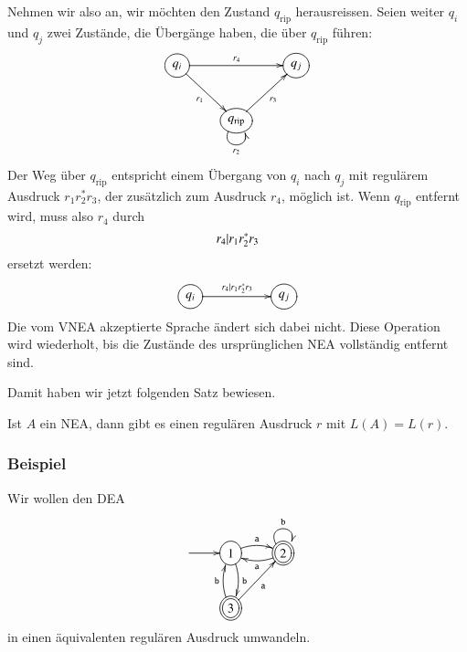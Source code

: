 Nehmen wir also an, wir möchten den Zustand $q_ {\text{rip}}$
herausreissen.
Seien weiter $q_i$ und $q_j$ zwei Zustände, die
Übergänge haben, die über $q_{\text{rip}}$ führen:
\[
\entrymodifiers={++[o][F]}
\xymatrix{
{q_i}\ar[rr]^{r_4} \ar[dr]_{r_1}
	&*+\txt{}
		&{q_j}
\\
*+\txt{}
	&{q_{\text{rip}}}\ar[ur]_{r_3} \ar@(dl,dr)_{r_2}
}
\]
Der Weg über $q_{\text{rip}}$ entspricht einem Übergang
von $q_i$ nach $q_j$ mit regulärem Ausdruck $r_1r_2^*r_3$,
der zusätzlich zum Ausdruck $r_4$, möglich ist.
Wenn $q_{\text{rip}}$ entfernt wird, muss also $r_4$ durch 
\[
r_4{\tt |}r_1r_2^{\tt *}r_3
\]
ersetzt werden:
\[
\entrymodifiers={++[o][F]}
\xymatrix{
{q_i}\ar[rr]^{r_4|r_1r_2^*r_3}
	&*+\txt{}
		&{q_j}
}
\]
Die vom VNEA akzeptierte Sprache ändert sich dabei nicht.
Diese Operation wird wiederholt, bis die Zustände des ursprünglichen
NEA vollständig entfernt sind.

Damit  haben wir jetzt folgenden Satz bewiesen.
\begin{satz}
Ist $A$ ein NEA, dann gibt es einen regulären Ausdruck $r$ mit
$L(A)=L(r)$.
\end{satz}

\subsubsection{Beispiel}
Wir wollen den DEA
\[
\entrymodifiers={++[o][F]}
\xymatrix{
*+\txt{}\ar[r]
	&{1}\ar@/^/[r]^{\tt a} \ar@/^/[d]^{\tt b}
		&*++[o][F=]{2} \ar@(ul,ur)^{\tt b} \ar@/^/[l]^{\tt a}
\\
*+\txt{}
	&*++[o][F=]{3} \ar[ur]_{\tt a} \ar@/^/[u]^{\tt b}
}
\]
in einen äquivalenten regulären Ausdruck umwandeln.

